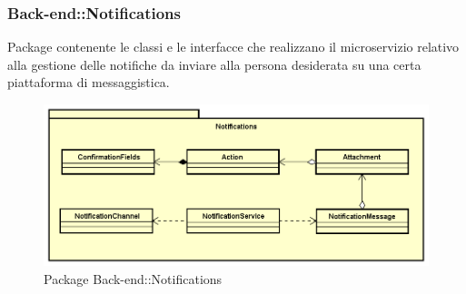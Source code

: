 \subsubsection{Back-end::Notifications}
Package contenente le classi e le interfacce che realizzano il microservizio relativo alla gestione delle notifiche da inviare alla persona desiderata su una certa piattaforma di messaggistica.
\begin{figure}[h] \centering \includegraphics[width=\textwidth,height=\textheight,keepaspectratio]{images/diagrams/back-end/Official_Backend_0304/Notifications.png}
	\caption{Package Back-end::Notifications}
\end{figure}
\newpage

